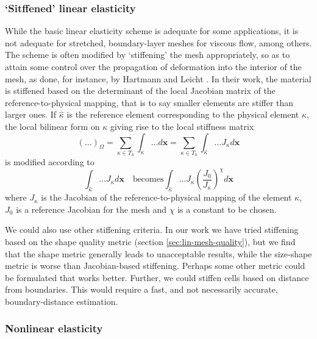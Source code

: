  \subsubsection{`Sitffened' linear elasticity}
 \label{subsec:stiffelast}
 While the basic linear elasticity scheme is adequate for some applications, it is not adequate for stretched, boundary-layer meshes for viscous flow, among others. The scheme is often modified by `stiffening' the mesh appropriately, so as to attain some control over the propagation of deformation into the interior of the mesh, as done, for instance, by Hartmann and Leicht \cite{curve:hartmann}. In their work, the material is stiffened based on the determinant of the local Jacobian matrix of the reference-to-physical mapping, that is to say smaller elements are stiffer than larger ones. If $\hat{\kappa}$ is the reference element corresponding to the physical element $\kappa$, the local bilinear form on $\kappa$ giving rise to the local stiffness matrix 
 \begin{equation}
 (\dots)_\Omega = \sum_{\kappa \in T_h} \int_{\kappa} \dots d\mathbf{x} = \sum_{\kappa \in T_h} \int_{\hat{\kappa}} \dots J_\kappa d\mathbf{x}
 \end{equation}
 is modified according to
 \begin{equation}
\int_{\hat{\kappa}} \dots J_\kappa d\mathbf{x} \quad \text{becomes} \int_{\hat{\kappa}} \dots J_\kappa \left(\frac{J_0}{J_\kappa}\right)^\chi d\mathbf{x}
 \end{equation}
 where $J_\kappa$ is the Jacobian of the reference-to-physical mapping of the element $\kappa$, $J_0$ is a reference Jacobian for the mesh and $\chi$ is a constant to be chosen.
 
 We could also use other stiffening criteria. In our work we have tried stiffening based on the shape quality metric (section \ref{sec:lin-mesh-quality}), but we find that the shape metric generally leads to unacceptable results, while the size-shape metric is worse than Jacobian-based stiffening. Perhaps some other metric could be formulated that works better. Further, we could stiffen cells based on distance from boundaries. This would require a fast, and not necessarily accurate, boundary-distance estimation.
 
 \subsubsection{Nonlinear elasticity}
 
